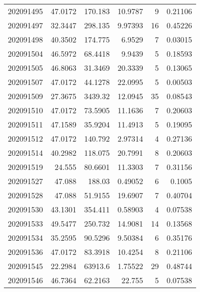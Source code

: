 \begin{tabular}{rrrrrr}
 202091495 &         47.0172  &      170.183  &           10.9787  &           9 & 0.21106 \\
 202091497 &         32.3447  &      298.135  &            9.97393 &          16 & 0.45226 \\
 202091498 &         40.3502  &      174.775  &            6.9529  &           7 & 0.03015 \\
 202091504 &         46.5972  &       68.4418 &            9.9439  &           5 & 0.18593 \\
 202091505 &         46.8063  &       31.3469 &           20.3339  &           5 & 0.13065 \\
 202091507 &         47.0172  &       44.1278 &           22.0995  &           5 & 0.00503 \\
 202091509 &         27.3675  &     3439.32   &           12.0945  &          35 & 0.08543 \\
 202091510 &         47.0172  &       73.5905 &           11.1636  &           7 & 0.20603 \\
 202091511 &         47.1589  &       35.9204 &           11.4913  &           5 & 0.19095 \\
 202091512 &         47.0172  &      140.792  &            2.97314 &           4 & 0.27136 \\
 202091514 &         40.2982  &      118.075  &           20.7991  &           8 & 0.20603 \\
 202091519 &         24.555   &       80.6601 &           11.3303  &           7 & 0.31156 \\
 202091527 &         47.088   &      188.03   &            0.49052 &           6 & 0.1005  \\
 202091528 &         47.088   &       51.9155 &           19.6907  &           7 & 0.40704 \\
 202091530 &         43.1301  &      354.411  &            0.58903 &           4 & 0.07538 \\
 202091533 &         49.5477  &      250.732  &           14.9081  &          14 & 0.13568 \\
 202091534 &         35.2595  &       90.5296 &            9.50384 &           6 & 0.35176 \\
 202091536 &         47.0172  &       83.3918 &           10.4254  &           8 & 0.21106 \\
 202091545 &         22.2984  &    63913.6    &            1.75522 &          29 & 0.48744 \\
 202091546 &         46.7364  &       62.2163 &           22.755   &           5 & 0.07538 \\

\end{tabular}
